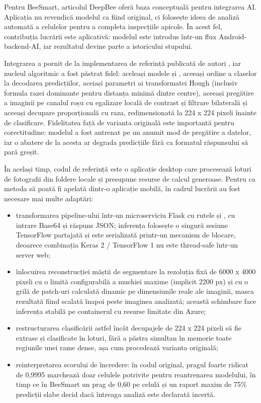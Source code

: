Pentru BeeSmart, articolul DeepBee oferă baza conceptuală pentru integrarea AI. Aplicația nu revendică modelul ca fiind original, ci folosește ideea de analiză automată a celulelor pentru a completa inspecțiile apicole. În acest fel, contribuția lucrării este aplicativă: modelul este introdus într-un flux Android-backend-AI, iar rezultatul devine parte a istoricului stupului.

Integrarea a pornit de la implementarea de referință publicată de autori \cite{deepbeeSource}, iar nucleul algoritmic a fost păstrat fidel: aceleași modele  și , aceeași ordine a claselor la decodarea predicțiilor, aceiași parametri ai transformatei Hough (inclusiv formula razei dominante pentru distanța minimă dintre centre), aceeași pregătire a imaginii pe canalul roșu cu egalizare locală de contrast și filtrare bilaterală și aceeași decupare proporțională cu raza, redimensionată la 224 x 224 pixeli înainte de clasificare. Fidelitatea față de varianta originală este importantă pentru corectitudine: modelul a fost antrenat pe un anumit mod de pregătire a datelor, iar o abatere de la acesta ar degrada predicțiile fără ca formatul răspunsului să pară greșit.

În același timp, codul de referință este o aplicație desktop care procesează loturi de fotografii din foldere locale și presupune resurse de calcul generoase. Pentru ca metoda să poată fi apelată dintr-o aplicație mobilă, în cadrul lucrării au fost necesare mai multe adaptări:
\begin{itemize}
	\item transformarea pipeline-ului într-un microserviciu Flask cu rutele  și , cu intrare Base64 și răspuns JSON; inferența folosește o singură sesiune TensorFlow partajată și este serializată printr-un mecanism de blocare, deoarece combinația Keras 2 / TensorFlow 1 nu este thread-safe într-un server web;
	\item înlocuirea reconstrucției măștii de segmentare la rezoluția fixă de 6000 x 4000 pixeli cu o limită configurabilă a muchiei maxime (implicit 2200 px) și cu o grilă de patch-uri calculată dinamic pe dimensiunile reale ale imaginii, masca rezultată fiind scalată înapoi peste imaginea analizată; această schimbare face inferența stabilă pe containerul cu resurse limitate din Azure;
	\item restructurarea clasificării astfel încât decupajele de 224 x 224 pixeli să fie extrase și clasificate în loturi, fără a păstra simultan în memorie toate regiunile unei rame dense, așa cum procedează varianta originală;
	\item reinterpretarea scorului de încredere: în codul original, pragul foarte ridicat de 0,9995 marchează doar celulele potrivite pentru reantrenarea modelului, în timp ce în BeeSmart un prag de 0,60 pe celulă și un raport maxim de 75\% predicții slabe decid dacă întreaga analiză este declarată incertă.
\end{itemize}

